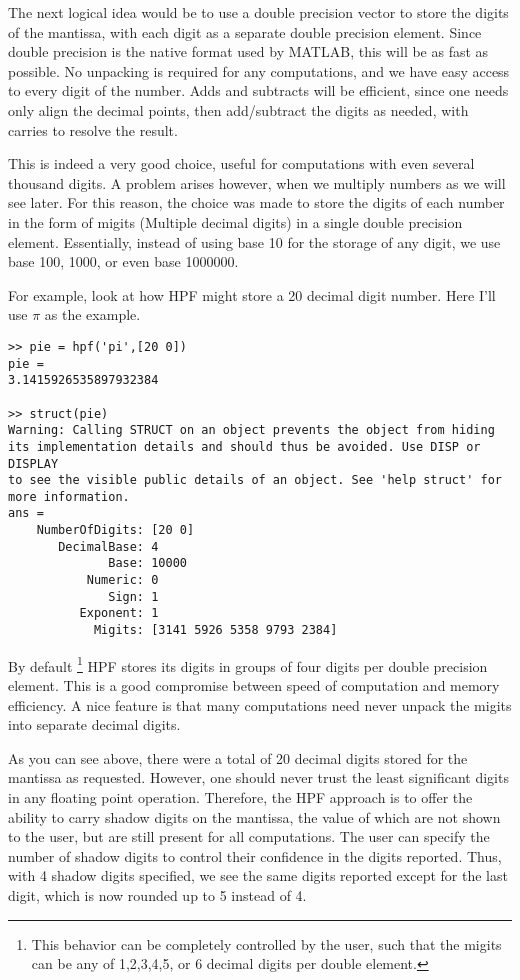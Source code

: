\documentclass[a4paper,12pt]{article}
\begin{document}
The next logical idea would be to use a double precision vector to store the digits of the mantissa, with each digit as a separate double precision element. Since double precision is the native format used by MATLAB, this will be as fast as possible. No unpacking is required for any computations, and we have easy access to every digit of the number. Adds and subtracts will be efficient, since one needs only align the decimal points, then add/subtract the digits as needed, with carries to resolve the result.

This is indeed a very good choice, useful for computations with even several thousand digits. A problem arises however, when we multiply numbers as we will see later. For this reason, the choice was made to store the digits of each number in the form of migits (Multiple decimal digits) in a single double precision element. Essentially, instead of using base 10 for the storage of any digit, we use base 100, 1000, or even base 1000000.

For example, look at how HPF might store a 20 decimal digit number. Here I'll use $\pi$ as the example.
\newpage
\begin{lstlisting}
>> pie = hpf('pi',[20 0])
pie =
3.1415926535897932384

>> struct(pie)
Warning: Calling STRUCT on an object prevents the object from hiding its implementation details and should thus be avoided. Use DISP or DISPLAY
to see the visible public details of an object. See 'help struct' for more information.
ans =
    NumberOfDigits: [20 0]
       DecimalBase: 4
              Base: 10000
           Numeric: 0
              Sign: 1
          Exponent: 1
            Migits: [3141 5926 5358 9793 2384]
\end{lstlisting}

By default \footnote{This behavior can be completely controlled by the user, such that the migits can be any of 1,2,3,4,5, or 6 decimal digits per double element.} HPF stores its digits in groups of four digits per double precision element. This is a good compromise between speed of computation and memory efficiency. A nice feature is that many computations need never unpack the migits into separate decimal digits.

As you can see above, there were a total of 20 decimal digits stored for the mantissa as requested. However, one should never trust the least significant digits in any floating point operation. Therefore, the HPF approach is to offer the ability to carry shadow digits on the mantissa, the value of which are not shown to the user, but are still present for all computations. The user can specify the number of shadow digits to control their confidence in the digits reported. Thus, with 4 shadow digits specified, we see the same digits reported except for the last digit, which is now rounded up to 5 instead of 4.
\end{document}
